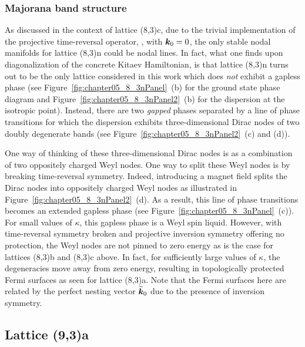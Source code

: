 %
%
\subsubsection{Majorana band structure}
%
%
As discussed in the context of lattice (8,3)c, due to the trivial implementation of the projective time-reversal operator, \ie, with $\bm{k}_0 = 0$, the only stable nodal manifolds for lattice (8,3)n could be nodal lines.
In fact, what one finds upon diagonalization of the concrete Kitaev Hamiltonian, is that lattice (8,3)n turns out to be the only lattice considered in this work which does \textit{not} exhibit a gapless phase (see Figure~\ref{fig:chapter05_8_3nPanel}~(b) for the ground state phase diagram and Figure~\ref{fig:chapter05_8_3nPanel2}~(b) for the dispersion at the isotropic point).
Instead, there are two \textit{gapped} phases separated by a line of phase transitions for which the dispersion exhibits three-dimensional Dirac nodes of two doubly degenerate bands (see Figure~\ref{fig:chapter05_8_3nPanel2}~(c) and (d)).

One way of thinking of these three-dimensional Dirac nodes is as a combination of two oppositely charged Weyl nodes.
One way to split these Weyl nodes is by breaking time-reversal symmetry.
Indeed, introducing a magnet field splits the Dirac nodes into oppositely charged Weyl nodes as illustrated in Figure~\ref{fig:chapter05_8_3nPanel2}~(d).
As a result, this line of phase transitions becomes an extended gapless phase (see Figure~\ref{fig:chapter05_8_3nPanel}~(c)).
For small values of $\kappa$, this gapless phase is a Weyl spin liquid.
However, with time-reversal symmetry broken and projective inversion symmetry offering no protection, the Weyl nodes are not pinned to zero energy as is the case for lattices (8,3)b and (8,3)c above.
In fact, for sufficiently large values of $\kappa$, the degeneracies move away from zero energy, resulting in topologically protected Fermi surfaces as seen for lattice (8,3)a.
Note that the Fermi surfaces here are related by the perfect nesting vector $\widetilde{\bm{k}}_0$ due to the presence of inversion symmetry.


%
%
\subsection{Lattice (9,3)a}
\label{section:chapter05_9_3a}
%
%
